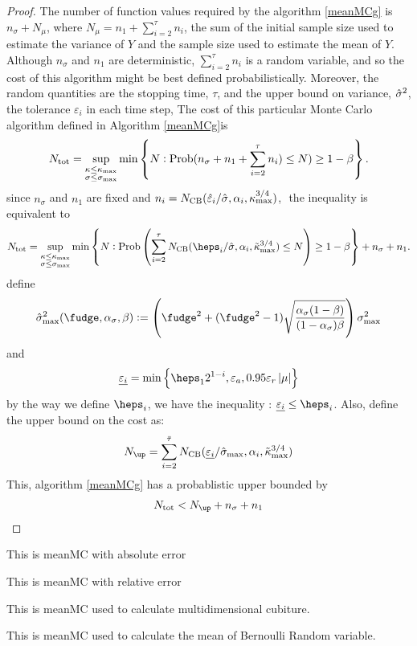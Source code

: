 \documentclass{iitthesis}
\begin{document}
\begin{proof}
The number of function values required by the algorithm \ref{meanMCg} is $n_{\sigma}+N_\mu$, where $N_\mu=n_1+\sum_{i=2}^\tau n_i$, the sum of the initial sample size used to estimate the variance of $Y$ and the sample size used to estimate the mean of $Y$.  Although $n_{\sigma}$ and $n_1$ are deterministic, $\sum_{i=2}^\tau n_i$ is a random variable, and so the cost of this algorithm might be best defined probabilistically.  Moreover, the random quantities are the stopping time, $\tau$, and the upper bound on variance, $\hat{\sigma}^2$, the tolerance $\varepsilon_i$ in each time step, 
The cost of this particular Monte Carlo algorithm defined in Algorithm \ref{meanMCg}is
\begin{equation*}
N_{\text{tot}} = \sup_{\substack{\kappa \le \kappa_{\max} \\ \sigma \le \sigma_{\max}}} \min\left\{N : \operatorname{Prob}(n_{\sigma} + n_1+\sum_{i=2}^\tau n_i) \le N) \ge 1-\beta  \right \}.
\end{equation*}
since $n_\sigma$ and $n_1$ are fixed and $n_i =  N_{\text{CB}}(\hat{\varepsilon}_{i}/\hat{\sigma},\alpha_{i},\kappa_{\max}^{3/4})$, $ $ the inequality is equivalent to 
\begin{equation*}
N_{\text{tot}} = \sup_{\substack{\kappa \le \kappa_{\max} \\ \sigma \le \sigma_{\max}}} \min\left\{N : \Prob\left(\sum_{i=2}^\tau N_{\text{CB}}(\heps_i/\hsigma,\alpha_i,\tilde\kappa_{\max}^{3/4}) \le N\right) \ge 1-\beta  \right \}+n_{\sigma} + n_1.
\end{equation*}
define 
\begin{align}\label{sigmax}
\hsigma_{\max}^2 (\fudge, \alpha_{\sigma},\beta) := \left(\fudge^2+(\fudge^2-1)\sqrt{\frac{\alpha_{\sigma}(1-\beta)}{(1-\alpha_{\sigma})\beta}}\right)\sigma_{\max}^2
\end{align}
and
\begin{align}
  \underline{\varepsilon_i} = \min \left \{ \heps_12^{1-i},\varepsilon_a, 0.95\varepsilon_r\abs{\mu} \right \}
\end{align}
by the way we define $\heps_i$, we have the inequality : $\underline{\varepsilon_i}\leq \heps_i$.
Also, define the upper bound on the cost as:
$$N_{\up} = \sum_{i=2}^{\bar{\tau}} N_{\text{CB}}(\underline{\varepsilon_i} /\hsigma_{\max},\alpha_i,\tilde\kappa_{\max}^{3/4})$$
This, algorithm \ref{meanMCg} has a probablistic upper bounded by
\begin{align}
N_{\text{tot}} < N_{\up}+n_\sigma+n_1
\end{align}
\end{proof}

This is meanMC with absolute error

This is meanMC with relative error

This is meanMC used to calculate multidimensional cubiture.

This is meanMC used to calculate the mean of Bernoulli Random variable.





\end{document}
